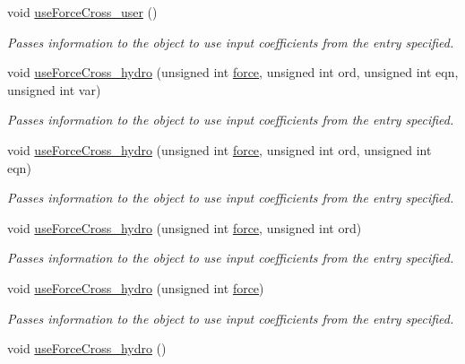 \begin{DoxyCompactItemize}
void \hyperlink{classosea_1_1ofreq_1_1_motion_model_a9858717cea37d004dd02a5906225d765}{use\-Force\-Cross\-\_\-user} ()
\begin{DoxyCompactList}\small\item\em Passes information to the object to use input coefficients from the entry specified. \end{DoxyCompactList}\item 
void \hyperlink{classosea_1_1ofreq_1_1_motion_model_abfd6e4a22ec23d7ee462adb737fab3f2}{use\-Force\-Cross\-\_\-hydro} (unsigned int \hyperlink{input__syntax_8dox_ab0a92c70357da47fe86696522eab7dc8}{force}, unsigned int ord, unsigned int eqn, unsigned int var)
\begin{DoxyCompactList}\small\item\em Passes information to the object to use input coefficients from the entry specified. \end{DoxyCompactList}\item 
void \hyperlink{classosea_1_1ofreq_1_1_motion_model_a6f745d15ee67cafd2943e016166a7f51}{use\-Force\-Cross\-\_\-hydro} (unsigned int \hyperlink{input__syntax_8dox_ab0a92c70357da47fe86696522eab7dc8}{force}, unsigned int ord, unsigned int eqn)
\begin{DoxyCompactList}\small\item\em Passes information to the object to use input coefficients from the entry specified. \end{DoxyCompactList}\item 
void \hyperlink{classosea_1_1ofreq_1_1_motion_model_ab85d9879e0af7e035aa90d264a28095e}{use\-Force\-Cross\-\_\-hydro} (unsigned int \hyperlink{input__syntax_8dox_ab0a92c70357da47fe86696522eab7dc8}{force}, unsigned int ord)
\begin{DoxyCompactList}\small\item\em Passes information to the object to use input coefficients from the entry specified. \end{DoxyCompactList}\item 
void \hyperlink{classosea_1_1ofreq_1_1_motion_model_a642fb3df74231a5ad0c9f068e23f73ca}{use\-Force\-Cross\-\_\-hydro} (unsigned int \hyperlink{input__syntax_8dox_ab0a92c70357da47fe86696522eab7dc8}{force})
\begin{DoxyCompactList}\small\item\em Passes information to the object to use input coefficients from the entry specified. \end{DoxyCompactList}\item 
void \hyperlink{classosea_1_1ofreq_1_1_motion_model_a9eec7ca7d497eaff8ae8c4dff24ec5da}{use\-Force\-Cross\-\_\-hydro} ()

\end{DoxyCompactItemize}
